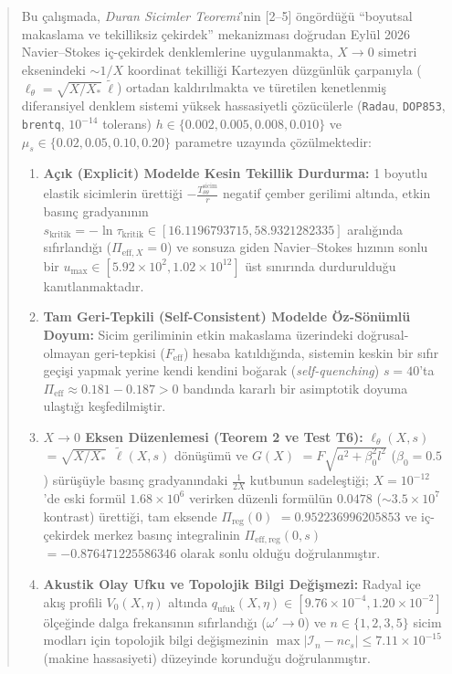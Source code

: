 \documentclass[12pt,a4paper]{article}
\begin{document}
\begin{abstract}
Bu çalışmada, \textit{Duran Sicimler Teoremi}'nin [2--5] öngördüğü ``boyutsal makaslama ve tekilliksiz çekirdek'' mekanizması doğrudan Eylül 2026 Navier--Stokes iç-çekirdek denklemlerine uygulanmakta, $X \to 0$ simetri eksenindeki $\sim 1/X$ koordinat tekilliği Kartezyen düzgünlük çarpanıyla ($\ell_\theta = \sqrt{X/X_*}\,\tilde{\ell}$) ortadan kaldırılmakta ve türetilen kenetlenmiş diferansiyel denklem sistemi yüksek hassasiyetli çözücülerle (\texttt{Radau}, \texttt{DOP853}, \texttt{brentq}, $10^{-14}$ tolerans) $h \in \{0.002, 0.005, 0.008, 0.010\}$ ve $\mu_s \in \{0.02, 0.05, 0.10, 0.20\}$ parametre uzayında çözülmektedir:
\begin{enumerate}
    \item \textbf{Açık (Explicit) Modelde Kesin Tekillik Durdurma:} 1 boyutlu elastik sicimlerin ürettiği $-\frac{T_{\theta\theta}^{\mathrm{sicim}}}{r}$ negatif çember gerilimi altında, etkin basınç gradyanının $s_{\mathrm{kritik}} = -\ln \tau_{\mathrm{kritik}} \in [16.1196793715, 58.9321282335]$ aralığında sıfırlandığı ($\Pi_{\mathrm{eff}, X} = 0$) ve sonsuza giden Navier--Stokes hızının sonlu bir $u_{\max} \in [5.92 \times 10^2, 1.02 \times 10^{12}]$ üst sınırında durdurulduğu kanıtlanmaktadır.
    \item \textbf{Tam Geri-Tepkili (Self-Consistent) Modelde Öz-Sönümlü Doyum:} Sicim geriliminin etkin makaslama üzerindeki doğrusal-olmayan geri-tepkisi ($F_{\mathrm{eff}}$) hesaba katıldığında, sistemin keskin bir sıfır geçişi yapmak yerine kendi kendini boğarak (\textit{self-quenching}) $s=40$'ta $\Pi_{\mathrm{eff}} \approx 0.181 - 0.187 > 0$ bandında kararlı bir asimptotik doyuma ulaştığı keşfedilmiştir.
    \item \textbf{$X \to 0$ Eksen Düzenlemesi (Teorem 2 ve Test T6):} $\ell_\theta(X,s)$ $= \sqrt{X/X_*}$ $\,\tilde{\ell}(X,s)$ dönüşümü ve $G(X)$ $= F\sqrt{a^2 + \beta_0^2 l^2}$ ($\beta_0 = 0.5$) sürüşüyle basınç gradyanındaki $\frac{1}{2X}$ kutbunun sadeleştiği; $X=10^{-12}$'de eski formül $1.68 \times 10^6$ verirken düzenli formülün $0.0478$ ($\sim 3.5 \times 10^7$ kontrast) ürettiği, tam eksende $\Pi_{\mathrm{reg}}(0)$ $= 0.952236996205853$ ve iç-çekirdek merkez basınç integralinin $\Pi_{\mathrm{eff,reg}}(0,s)$ $= -0.876471225586346$ olarak sonlu olduğu doğrulanmıştır.
    \item \textbf{Akustik Olay Ufku ve Topolojik Bilgi Değişmezi:} Radyal içe akış profili $V_0(X,\eta)$ altında $q_{\mathrm{ufuk}}(X,\eta) \in [9.76 \times 10^{-4}, 1.20 \times 10^{-2}]$ ölçeğinde dalga frekansının sıfırlandığı ($\omega' \to 0$) ve $n \in \{1,2,3,5\}$ sicim modları için topolojik bilgi değişmezinin $\max|\mathcal{I}_n - n c_s| \le 7.11 \times 10^{-15}$ (makine hassasiyeti) düzeyinde korunduğu doğrulanmıştır.

\end{enumerate}
\end{abstract}
\end{document}
